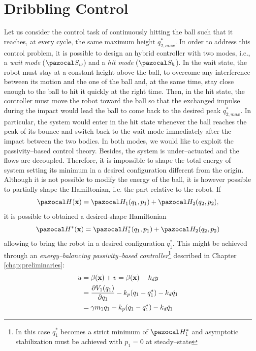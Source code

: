 \section{Dribbling Control}\label{sec:control}
%
Let us consider the control task of continuously hitting the ball such that it reaches, at every cycle, the same maximum height $q_{2,max}^*$. In order to address this control problem, it is possible to design an hybrid controller with two modes, i.e., a \textit{wait mode} ($\Sa_{w}$) and a \textit{hit mode} ($\Sa_{h}$). In the wait state, the robot must stay at a constant height above the ball, to overcome any interference between its motion and the one of the ball and, at the same time, stay close enough to the ball to hit it quickly at the right time.
Then, in the hit state, the controller must move the robot toward the ball so that the exchanged impulse during the impact would lead the ball to come back to the desired peak $q_{2,max}^*$. In particular, the system would enter in the hit state whenever the ball reaches the peak of its bounce and switch back to the wait mode immediately after the impact between the two bodies. 
%
In both modes, we would like to exploit the passivity--based control theory. Besides, the system is under--actuated and the flows are decoupled. Therefore, it is impossible to shape the total energy of system setting its minimum in a desired configuration different from the origin. Although it is not possible to modify the energy of the ball, it is however possible to partially shape the Hamiltonian, i.e. the part relative to the robot. If 
%
\begin{equation}
    \Ha(\xb) = \Ha_1(q_1,p_1) + \Ha_2(q_2,p_2),
\end{equation}
%
it is possible to obtained a desired-shape Hamiltonian
%
\begin{equation}
     \Ha^*(\xb)  = \Ha_1^*(q_1,p_1) + \Ha_2(q_2,p_2)
\end{equation}
%
allowing to bring the robot in a desired configuration $q_1^*$. This might be achieved through an \textit{energy--balancing passivity--based controller}\footnote{In this case $q_1^*$ becomes a strict minimum of $\Ha_1^*$ and asymptotic stabilization must be achieved with $p_1 = 0$ at steady--state} \citep{ortega2001putting,ortega2008control,secchi2007control} described in Chapter \ref{chap:preliminaries}:
%
\begin{align*}
u &= \beta(\mathbf{x}) + v = \beta(\mathbf{x}) - k_dy \\
&= \frac{\partial V_1(q_1)}{\partial q_1} - k_p(q_1 -q_1^*) - k_d\dot{q}_1\\
&= \gamma m_1q_1- k_p(q_1 -q_1^*) - k_d\dot{q}_1
\end{align*}
